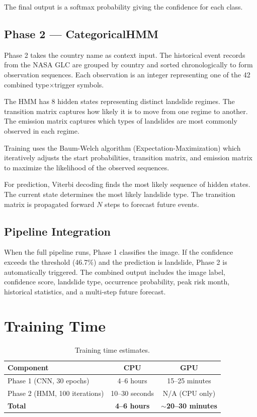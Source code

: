 \documentclass[11pt]{article}
\begin{document}
The final output is a softmax probability giving the confidence for each class.

\subsection{Phase 2 --- CategoricalHMM}

Phase 2 takes the country name as context input. The historical event records from the NASA GLC are grouped by country and sorted chronologically to form observation sequences. Each observation is an integer representing one of the 42 combined type$\times$trigger symbols.

The HMM has 8 hidden states representing distinct landslide regimes. The transition matrix captures how likely it is to move from one regime to another. The emission matrix captures which types of landslides are most commonly observed in each regime.

Training uses the Baum-Welch algorithm (Expectation-Maximization) which iteratively adjusts the start probabilities, transition matrix, and emission matrix to maximize the likelihood of the observed sequences.

For prediction, Viterbi decoding finds the most likely sequence of hidden states. The current state determines the most likely landslide type. The transition matrix is propagated forward $N$ steps to forecast future events.

\subsection{Pipeline Integration}

When the full pipeline runs, Phase 1 classifies the image. If the confidence exceeds the threshold (46.7\%) and the prediction is landslide, Phase 2 is automatically triggered. The combined output includes the image label, confidence score, landslide type, occurrence probability, peak risk month, historical statistics, and a multi-step future forecast.

\section{Training Time}

\begin{table}[H]
    \centering
    \begin{tabular}{lcc}
        \toprule
        \textbf{Component} & \textbf{CPU} & \textbf{GPU} \\
        \midrule
        Phase 1 (CNN, 30 epochs) & 4--6 hours & 15--25 minutes \\
        Phase 2 (HMM, 100 iterations) & 10--30 seconds & N/A (CPU only) \\
        \midrule
        \textbf{Total} & \textbf{4--6 hours} & \textbf{$\sim$20--30 minutes} \\
        \bottomrule
    \end{tabular}
    \caption{Training time estimates.}
\end{table}
\end{document}
